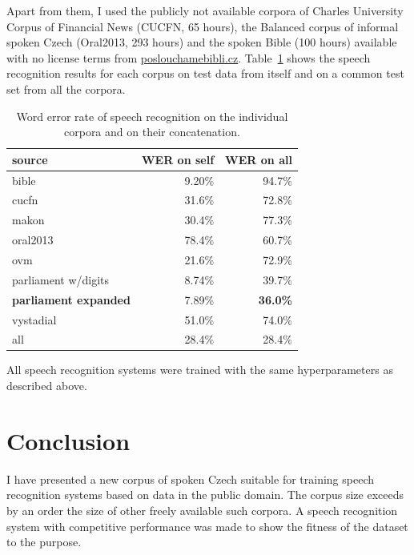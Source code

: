 \documentclass[conference]{IEEEtran}
\begin{document}
Apart from them, I used the publicly not available corpora of Charles University
Corpus of Financial News (CUCFN, 65 hours)\cite{byrne1999large}, the Balanced
corpus of informal spoken Czech (Oral2013, 293 hours)\cite{oral2013} and the
spoken Bible (100 hours) available with no license terms from
\url{poslouchamebibli.cz}. Table~\ref{tab:csasr:results} shows the speech recognition
results for each corpus on test data from itself and on a common test set from
all the corpora.

\begin{table}[htpb]
\caption{Word error rate of speech recognition on the individual corpora and on
their concatenation.}
\centering
\begin{tabular}{|l||r|r|}
\hline
source    & WER on self & WER on all \\
\hline
bible     & 9.20\%  & 94.7\% \\
cucfn     & 31.6\%  & 72.8\% \\
makon     & 30.4\%  & 77.3\% \\
oral2013  & 78.4\%  & 60.7\% \\
ovm       & 21.6\%  & 72.9\% \\
parliament w/digits
          & 8.74\%  & 39.7\% \\
\textbf{parliament expanded}
          & 7.89\%  & \textbf{36.0\%} \\
vystadial & 51.0\%  & 74.0\% \\
\hline
all       & 28.4\%  & 28.4\% \\
\hline
\end{tabular}
\label{tab:csasr:results}
\end{table}

All speech recognition systems were trained with the same hyperparameters as
described above.%

\section{Conclusion}

I have presented a new corpus of spoken Czech suitable for training speech
recognition systems based on data in the public domain. The corpus size exceeds
by an order the size of other freely available such corpora. A speech
recognition system with competitive performance was made to show the fitness
of the dataset to the purpose.
\end{document}

